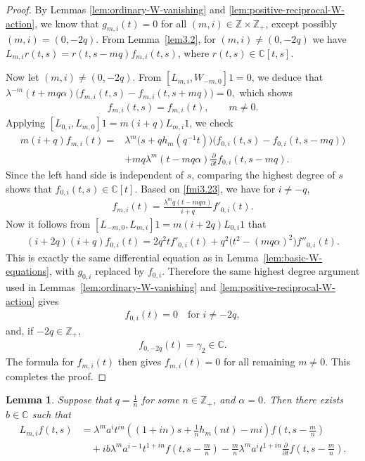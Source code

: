 \documentclass[a4paper]{amsart}
\numberwithin{equation}{section}
\newtheorem{lemma}[theorem]{Lemma}
\begin{document}
\begin{proof}
By Lemmas \ref{lem:ordinary-W-vanishing} and \ref{lem:positive-reciprocal-W-action}, we know 
  that
$
g_{m,i}(t)=0
$
for all $(m,i)\in\mathbb Z\times\mathbb Z_+$, except possibly
$(m,i)=(0,-2q)$.
From  Lemma~\ref{lem3.2}, for
$(m,i)\neq(0,-2q)$ we have
$
L_{m,i}r(t,s)=r(t,s-mq)f_{m,i}(t,s)$,
where $r(t,s)\in\mathbb C[t,s].
$

Now let $(m,i)\neq(0,-2q)$.   From   $[L_{m,i},W_{-m,0}]1=0$, we deduce that
$
\lambda^{-m}(t+mq\alpha)
\bigl(f_{m,i}(t,s)-f_{m,i}(t,s+mq)\bigr)=0,
$
which shows
\begin{align*}
f_{m,i}(t,s)=f_{m,i}(t),\qquad m\neq0.
\end{align*}
Applying $[L_{0,i},L_{m,0}]1=m(i+q)L_{m,i}1$, we check
\begin{align}\label{fmi3.23}
m(i+q)f_{m,i}(t)
=&\lambda^m\bigl(s+qh_m(q^{-1}t)\bigr)
\bigl(f_{0,i}(t,s)-f_{0,i}(t,s-mq)\bigr)  \\
&\nonumber
+mq\lambda^m(t-mq\alpha)
\frac{\partial}{\partial t}f_{0,i}(t,s-mq).
\end{align}
Since the left hand side is independent of $s$, comparing the highest degree of   $s$ shows that $f_{0,i}(t,s)\in\mathbb C[t]$. Based on   \eqref{fmi3.23}, we have for $i\neq -q$,
\begin{align*}
f_{m,i}(t)
=
\frac{\lambda^mq(t-mq\alpha)}{i+q}f'_{0,i}(t).
\end{align*}
Now it follows from  $[L_{-m,0},L_{m,i}]1=m(i+2q)L_{0,i}1$ that 
\begin{align*}
(i+2q)(i+q)f_{0,i}(t)
=
2q^2t f'_{0,i}(t)
+
q^2\big(t^2-(mq\alpha)^2\big)f''_{0,i}(t).
\end{align*}
This is exactly the same differential equation as in
Lemma~\ref{lem:basic-W-equations}, with $g_{0,i}$ replaced by $f_{0,i}$.
Therefore the same highest degree argument used in
Lemmas~\ref{lem:ordinary-W-vanishing} and
\ref{lem:positive-reciprocal-W-action} gives
\begin{align*}
f_{0,i}(t)=0
\quad\text{for } i\neq -2q,
\end{align*}
and, if $-2q\in\mathbb Z_+$,
\begin{align*}
f_{0,-2q}(t)=\gamma_2\in\mathbb C.
\end{align*}
The formula for $f_{m,i}(t)$ then gives
$f_{m,i}(t)=0$ for all remaining $m\neq0$. This completes the proof.
\end{proof}
\begin{lemma}\label{lem:positive-reciprocal-L-action}
Suppose that $q=\frac1n$ for some $n\in\mathbb Z_+$, and
$\alpha=0$.
Then there exists $b\in\mathbb C$ such that
\begin{align*}
L_{m,i}f(t,s)
&=
\lambda^m a^i t^{in}
\left((1+in)s+\frac1n h_m(nt)-mi\right)
f\left(t,s-\frac mn\right)\\
&\quad
+i b\lambda^m a^{i-1} t^{1+in}
f\left(t,s-\frac mn\right) 
-\frac mn\lambda^m a^i t^{1+in}
\frac{\partial}{\partial t}
f\left(t,s-\frac mn\right).
\end{align*}
\end{lemma}
\end{document}
